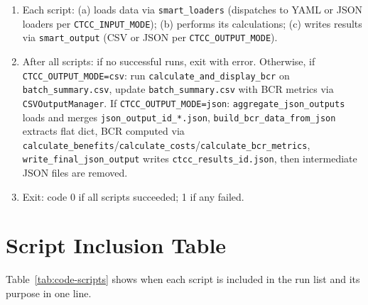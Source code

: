 \documentclass[ctcc_full_documentation.tex]{subfiles}
\begin{document}
\begin{enumerate}[leftmargin=*]
    \item Each script: (a) loads data via \texttt{smart\_loaders} (dispatches to YAML or JSON loaders per \texttt{CTCC\_INPUT\_MODE}); (b) performs its calculations; (c) writes results via \texttt{smart\_output} (CSV or JSON per \texttt{CTCC\_OUTPUT\_MODE}).
    \item After all scripts: if no successful runs, exit with error. Otherwise, if \texttt{CTCC\_OUTPUT\_MODE=csv}: run \texttt{calculate\_and\_display\_bcr} on \texttt{batch\_summary.csv}, update \texttt{batch\_summary.csv} with BCR metrics via \texttt{CSVOutputManager}. If \texttt{CTCC\_OUTPUT\_MODE=json}: \texttt{aggregate\_json\_outputs} loads and merges \texttt{json\_output\_\textlangle id\textrangle\_*.json}, \texttt{build\_bcr\_data\_from\_json} extracts flat dict, BCR computed via \texttt{calculate\_benefits}/\texttt{calculate\_costs}/\texttt{calculate\_bcr\_metrics}, \texttt{write\_final\_json\_output} writes \texttt{ctcc\_results\_\textlangle id\textrangle.json}, then intermediate JSON files are removed.
    \item Exit: code 0 if all scripts succeeded; 1 if any failed.
\end{enumerate}

\section{Script Inclusion Table}

Table~\ref{tab:code-scripts} shows when each script is included in the run list and its purpose in one line.
\end{document}
